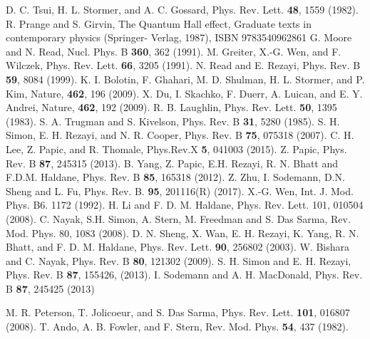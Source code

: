 \documentclass[twocolumn,showpacs,amsmath,amstex,amssymb,mathfonts,prb]{revtex4-1}
\begin{document}
\begin{thebibliography}{99}
  D. C. Tsui, H. L. Stormer, and A. C. Gossard, Phys. Rev. Lett. {\bf 48}, 1559 (1982).
 R. Prange and S. Girvin, The Quantum Hall effect, Graduate texts in contemporary physics (Springer- Verlag, 1987), ISBN 9783540962861
 G. Moore and N. Read, Nucl. Phys. B {\bf 360}, 362 (1991).
 M. Greiter, X.-G. Wen, and F. Wilczek, Phys. Rev. Lett. {\bf 66}, 3205 (1991).
 N. Read and E. Rezayi, Phys. Rev. B {\bf 59}, 8084 (1999).
 K. I. Bolotin, F. Ghahari, M. D. Shulman, H. L. Stormer, and P. Kim, Nature, {\bf 462}, 196 (2009).
 X. Du, I. Skachko, F. Duerr, A. Luican, and E. Y. Andrei, Nature, {\bf 462}, 192 (2009).
 R. B. Laughlin, Phys. Rev. Lett. {\bf 50}, 1395 (1983).
 S. A. Trugman and S. Kivelson, Phys. Rev. B {\bf 31}, 5280 (1985).
 S. H. Simon, E. H. Rezayi, and N. R. Cooper, Phys. Rev. B {\bf 75}, 075318 (2007).
 C. H. Lee, Z. Papic, and R. Thomale, Phys.Rev.X {\bf 5}, 041003 (2015).
 Z. Papic, Phys. Rev. B {\bf 87}, 245315 (2013).
 B. Yang, Z. Papic, E.H. Rezayi, R. N. Bhatt and F.D.M. Haldane, Phys. Rev. B {\bf 85}, 165318 (2012).
 Z. Zhu, I. Sodemann, D.N. Sheng and L. Fu, Phys. Rev. B. {\bf 95}, 201116(R) (2017).
 X.-G. Wen, Int. J. Mod. Phys. B6. 1172 (1992).
 H. Li and F. D. M. Haldane, Phys. Rev. Lett. 101, 010504 (2008).
 C. Nayak, S.H. Simon, A. Stern, M. Freedman and S. Das Sarma, Rev. Mod. Phys. 80, 1083 (2008).
 D. N. Sheng, X. Wan, E. H. Rezayi, K. Yang, R. N. Bhatt, and F. D. M. Haldane, Phys. Rev. Lett. {\bf 90}, 256802 (2003).
 W. Bishara and C. Nayak, Phys. Rev. B {\bf 80}, 121302 (2009).
S. H. Simon and E. H. Rezayi, Phys. Rev. B {\bf 87}, 155426, (2013).
 I. Sodemann and A. H. MacDonald, Phys. Rev. B {\bf 87}, 245425 (2013)

 M. R. Peterson, T. Jolicoeur, and S. Das Sarma, Phys. Rev. Lett. {\bf 101}, 016807 (2008).
 T. Ando, A. B. Fowler, and F. Stern, Rev. Mod. Phys. {\bf 54}, 437 (1982).


\end{thebibliography}
\end{document}
